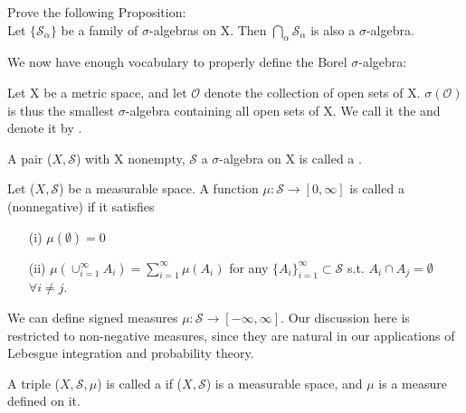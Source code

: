 \documentclass[11pt]{scrartcl}
\begin{document}
\begin{exercise} Prove the following Proposition:\\
Let $\{\mathcal{S}_\alpha\}$ be a family of $\sigma$-algebras on X. Then $\bigcap_\alpha \mathcal{S}_\alpha$ is also a $\sigma$-algebra.
\end{exercise}

We now have enough vocabulary to properly define the Borel $\sigma$-algebra:

\begin{definition}
Let X be a metric space, and let $\mathcal{O}$ denote the collection of open sets of X.  $\sigma(\mathcal{O})$ is thus the smallest $\sigma$-algebra containing all open sets of X. We call it the  and denote it by .
\end{definition}




\begin{definition}
A pair ($X,\mathcal{S}$) with X nonempty, $\mathcal{S}$ a $\sigma$-algebra on X is called a .
\end{definition}

\begin{definition}[Measure]
Let ($X,\mathcal{S}$) be a measurable space. A function $\mu : \mathcal{S} \rightarrow [0,\infty]$ is called a (nonnegative)  if it satisfies
\begin{itemize}
\item[(i)] $\mu(\emptyset) = 0$
\item[(ii)] $\mu(\cup_{i=1}^\infty A_i) = \sum_{i=1}^\infty \mu(A_i)$ for any $\{A_i\}_{i=1}^\infty \subset \mathcal{S}$ s.t. $ A_i \cap A_j = \emptyset$ $\forall i\neq j$.
\end{itemize}
\end{definition}

\begin{remark}
We can define signed measures $\mu : \mathcal{S} \rightarrow [-\infty,\infty]$. Our discussion here is restricted to non-negative measures, since they are natural in our applications of Lebesgue integration and probability theory.
\end{remark}

\begin{definition}
A triple ($X,\mathcal{S},\mu$) is called a  if ($X,\mathcal{S}$) is a measurable space, and $\mu$ is a measure defined on it.
\end{definition}
\end{document}

